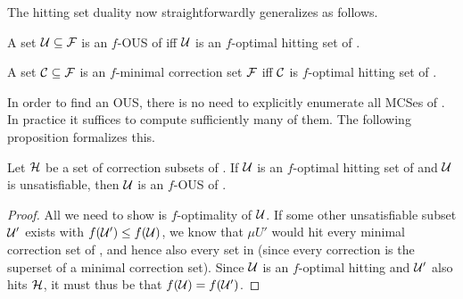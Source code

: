 The hitting set duality now straightforwardly generalizes as follows. 

\begin{proposition}\label{prop:optimal-hitting-set}
  A set $\mathcal{U} \subseteq \mathcal{F} $ is an $f$-OUS of \formula iff $\mathcal{U}$ is an $f$-optimal hitting set of \mcses{\formula}.
  
  \noindent
   A set  $\mathcal{C} \subseteq \mathcal{F} $ is an $f$-minimal correction set $ \mathcal{F} $ iff  $\mathcal{C}$ is $f$-optimal hitting set of .
\end{proposition}

In order to find an OUS, there is no need to explicitly enumerate all MCSes of \formula. In practice it suffices to compute sufficiently many of them. 
The following proposition formalizes this. 
% 

\begin{proposition}\label{prop:K}
  Let $\mathcal{H}$ be a set of correction subsets of \formula. 
  If $\mathcal{U}$ is an $f$-optimal hitting set of  and $\mathcal{U}$ is unsatisfiable, then $\mathcal{U}$ is an $f$-OUS of \formula. 
\end{proposition}
\begin{proof}
  All we need to show is $f$-optimality of $\mathcal{U}$.
  If some other unsatisfiable subset $\mathcal{U}'$ exists with $f(\mathcal{U}')\leq f(\mathcal{U})$, we know that $\mu{U}'$ would hit every minimal correction set of , and hence also every set in  (since every correction is the superset of a minimal correction set).
  Since $\mathcal{U}$ is an $f$-optimal hitting and $\mathcal{U}'$ also hits $\mathcal{H}$, it must thus be that $f(\mathcal{U})=f(\mathcal{U'})$. 
%   
\end{proof}




